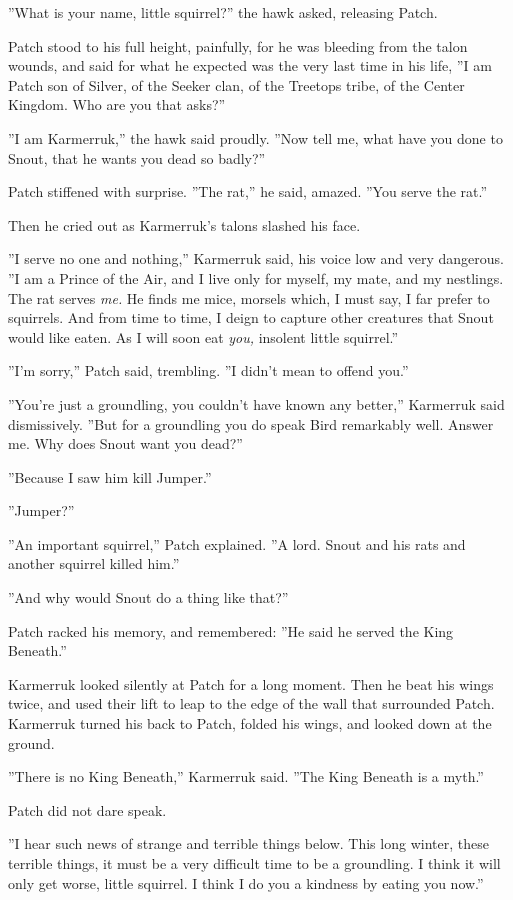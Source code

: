 \documentclass[12pt]{book}
\begin{document}
''What is your name, little squirrel?'' the hawk asked, releasing
Patch.

Patch stood to his full height, painfully, for he was bleeding from
the talon wounds, and said for what he expected was the very last time
in his life, ''I am Patch son of Silver, of the Seeker clan, of the
Treetops tribe, of the Center Kingdom. Who are you that asks?''

''I am Karmerruk,'' the hawk said proudly. ''Now tell me, what have
you done to Snout, that he wants you dead so badly?''

Patch stiffened with surprise. ''The rat,'' he said, amazed. ''You
serve the rat.''

Then he cried out as Karmerruk's talons slashed his face.

''I serve no one and nothing,'' Karmerruk said, his voice low and very
dangerous. ''I am a Prince of the Air, and I live only for myself, my
mate, and my nestlings. The rat serves \textit{me.} He finds me mice,
morsels which, I must say, I far prefer to squirrels. And from time to
time, I deign to capture other creatures that Snout would like
eaten. As I will soon eat \textit{you,} insolent little squirrel.''

''I'm sorry,'' Patch said, trembling. ''I didn't mean to offend you.''

''You're just a groundling, you couldn't have known any better,''
Karmerruk said dismissively. ''But for a groundling you do speak Bird
remarkably well. Answer me. Why does Snout want you dead?''

''Because I saw him kill Jumper.''

''Jumper?''

''An important squirrel,'' Patch explained. ''A lord. Snout and his
rats and another squirrel killed him.''

''And why would Snout do a thing like that?''

Patch racked his memory, and remembered: ''He said he served the King
Beneath.''

Karmerruk looked silently at Patch for a long moment. Then he beat his
wings twice, and used their lift to leap to the edge of the wall that
surrounded Patch. Karmerruk turned his back to Patch, folded his
wings, and looked down at the ground.

''There is no King Beneath,'' Karmerruk said. ''The King Beneath is a
myth.''

Patch did not dare speak.

''I hear such news of strange and terrible things below. This long
winter, these terrible things, it must be a very difficult time to be
a groundling. I think it will only get worse, little squirrel. I think
I do you a kindness by eating you now.''
\end{document}
